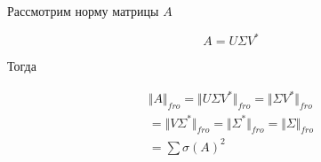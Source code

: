 \documentclass{article}
\begin{document}
    Рассмотрим норму матрицы $A$

    \begin{equation}
        A = U \Sigma V^{*}
    \end{equation}

    Тогда 

    \[
    \begin{gathered}
        \Vert A \Vert_{fro} = \Vert U \Sigma V^{*} \Vert_{fro} = \Vert \Sigma V^{*} \Vert_{fro} \\ 
        = \Vert V \Sigma^{*} \Vert_{fro} = \Vert \Sigma^{*} \Vert_{fro} = \Vert \Sigma \Vert_{fro} \\ 
        = \sum \sigma(A)^{2}
    \end{gathered}
    \]
    


    
\end{document}
